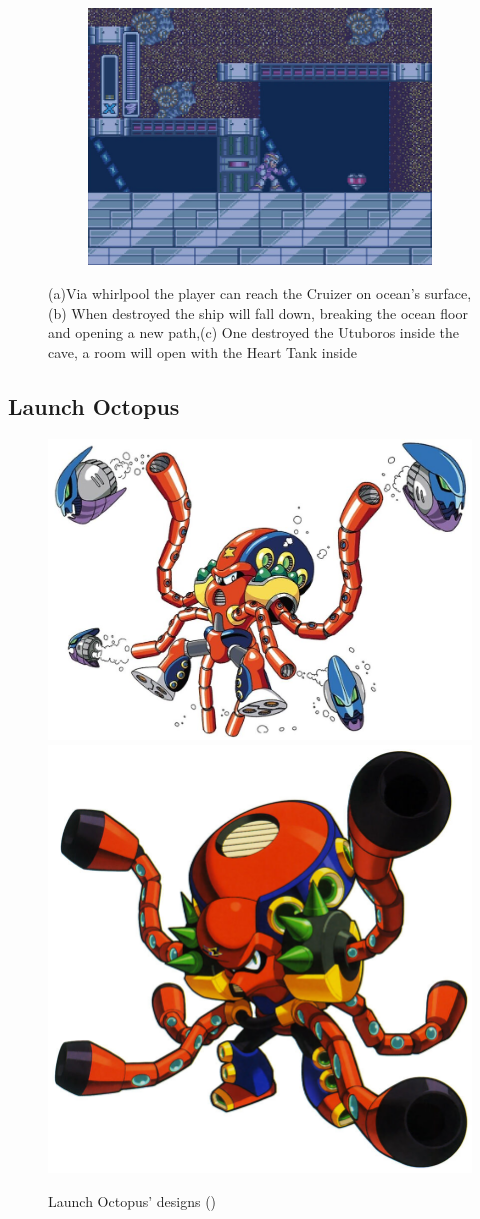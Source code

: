 \begin{figure}[htp]
\begin{subfigure}{0.4\textwidth}
		\includegraphics[width=\linewidth]{figures/X1/Launch_octopus/Octopus_heart_3.jpg}
		\caption{}
	\end{subfigure}
	\caption{(a)Via whirlpool the player can reach the Cruizer on ocean's surface,(b) When destroyed the ship will fall down, breaking the ocean floor and opening a new path,(c) One destroyed the Utuboros inside the cave, a room will open with the Heart Tank inside}
\end{figure}

\subsection{Launch Octopus}\label{boss:Launch_octopus}
\begin{figure}[htp]
	\centering
	\includegraphics[width=0.5\linewidth]{figures/X1/Launch_octopus/LaunchOctopus.jpg}
	\includegraphics[width=0.4\linewidth]{figures/X1/Launch_octopus/MHXLaunchOctopus.jpg}
	\caption{Launch Octopus' designs (\cite{book:MMX_Complete_art})}
\end{figure}

